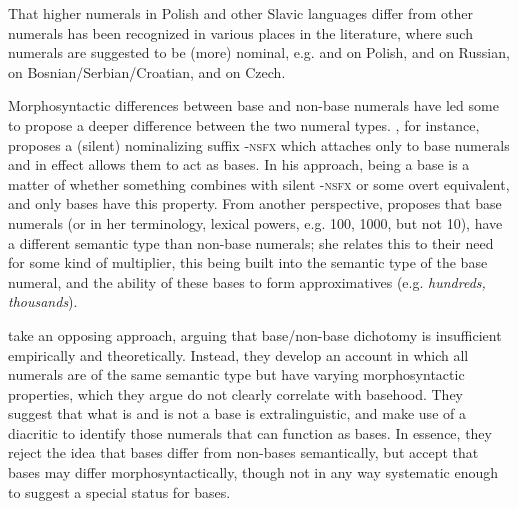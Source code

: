 \documentclass[output=paper]{langscibook}
\begin{document}
\noindent That higher numerals in Polish and other Slavic languages differ from other numerals has been recognized in various places in the literature, where such numerals are suggested to be (more) nominal, e.g. \citet{rutkowski2002} and \citet{miechowicz2014hist} on Polish, \citet{neidle1988role} and \citet{franks1995slavic} on Russian, \citet{giusti2005categorial} on Bosnian/Serbian/Croatian, and \citet{veselovska2001agreement} on Czech.

Morphosyntactic differences between base and non-base numerals have led some to propose a deeper difference between the two numeral types. \citet{kayne2005bases}, for instance, proposes a (silent) nominalizing suffix \textsc{-nsfx} which attaches only to base numerals and in effect allows them to act as bases. In his approach, being a base is a matter of whether something combines with silent \textsc{-nsfx} or some overt equivalent, and only bases have this property.
From another perspective, \citet{rothstein2013fregean} proposes that base numerals (or in her terminology, lexical powers, e.g. 100, 1000, but not 10), have a different semantic type than non-base numerals; she relates this to their need for some kind of multiplier, this being built into the semantic type of the base numeral, and the ability of these bases to form approximatives (e.g. \textit{hundreds, thousands}).

\citet{i&m2018} take an opposing approach, arguing that  base/non-base dichotomy is insufficient empirically and theoretically. Instead, they develop an account in which all numerals are of the same semantic type but have varying morphosyntactic properties, which they argue do not clearly correlate with basehood. They suggest that what is and is not a base is extralinguistic, and make use of a diacritic to identify those numerals that can function as bases. In essence, they reject the idea that bases differ from non-bases semantically, but accept that bases may differ morphosyntactically, though not in any way systematic enough to suggest a special status for bases.
\end{document}

